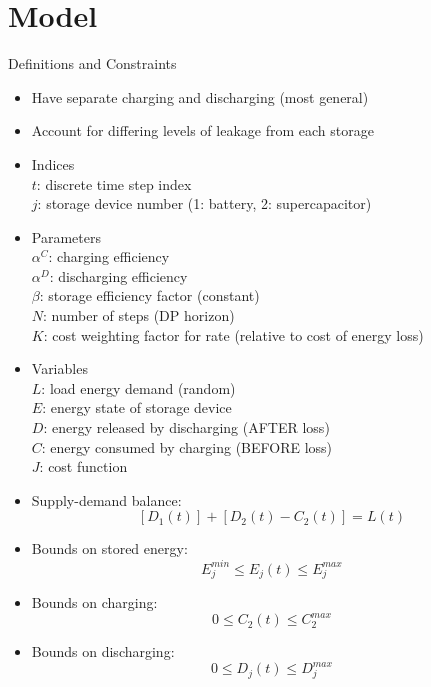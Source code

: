 \documentclass{beamer}
\begin{document}
\section{Model}

\begin{frame}{Definitions and Constraints}
\begin{itemize}
	\item Have separate charging and discharging (most general)
	\item Account for differing levels of leakage from each storage
	\item Indices\\
	$t$: discrete time step index\\
	$j$: storage device number (1: battery, 2: supercapacitor)\\
	\item Parameters\\
	$\alpha^{C}$: charging efficiency\\
	$\alpha^{D}$: discharging efficiency\\
	$\beta$: storage efficiency factor (constant)\\
	$N$: number of steps (DP horizon)\\
	$K$: cost weighting factor for rate (relative to cost of energy loss)\\
	\item Variables\\
	$L$: load energy demand (random)\\
	$E$: energy state of storage device\\
	$D$: energy released by discharging (AFTER loss)\\
	$C$: energy consumed by charging (BEFORE loss)\\
	$J$: cost function
	
	\item Supply-demand balance: 
	\begin{equation} \label{eq:BalanceEqn}\left[D_{1}(t)\right] + \left[D_{2}(t) - C_{2}(t)\right] = L(t) \end{equation}
	
	\item Bounds on stored energy: 
	\begin{equation}E_{j}^{min}\leq E_{j}(t)\leq E_{j}^{max}\end{equation}
	\item Bounds on charging:
	\begin{equation}0\leq C_{2}(t)\leq C_{2}^{max}\end{equation}
	\item Bounds on discharging:
	\begin{equation}0\leq D_{j}(t)\leq D_{j}^{max}\end{equation}
\end{itemize}
\end{frame}
\end{document}
